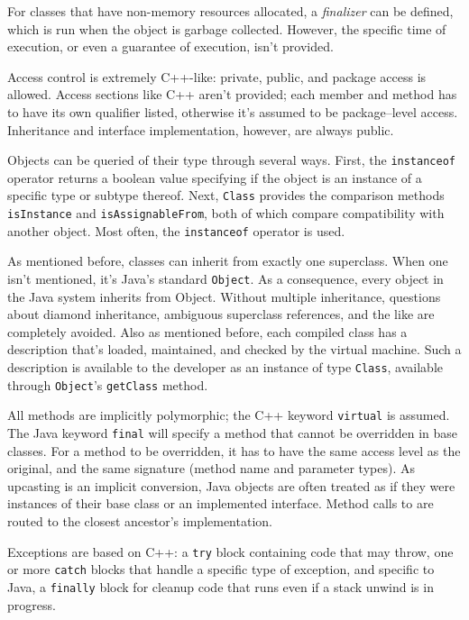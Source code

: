 For classes that have non-memory resources allocated, a \emph{finalizer} can
be defined, which is run when the object is garbage collected. However, the
specific time of execution, or even a guarantee of execution, isn't provided.

Access control is extremely C++-like: private, public, and package access is
allowed. Access sections like C++ aren't provided; each member and method has
to have its own qualifier listed, otherwise it's assumed to be package--level
access. Inheritance and interface implementation, however, are always public.

Objects can be queried of their type through several ways. First, the
\texttt{instanceof} operator returns a boolean value specifying if the object
is an instance of a specific type or subtype thereof. Next, \texttt{Class}
provides the comparison methods \texttt{isInstance} and
\texttt{isAssignableFrom}, both of which compare compatibility with another
object. Most often, the \texttt{instanceof} operator is used.

As mentioned before, classes can inherit from exactly one superclass. When one
isn't mentioned, it's Java's standard \texttt{Object}. As a consequence, every
object in the Java system inherits from Object. Without multiple inheritance,
questions about diamond inheritance, ambiguous superclass references, and the
like are completely avoided. Also as mentioned before, each compiled class has
a description that's loaded, maintained, and checked by the virtual machine.
Such a description is available to the developer as an instance of type
\texttt{Class}, available through \texttt{Object}'s \texttt{getClass} method.

All methods are implicitly polymorphic; the C++ keyword \texttt{virtual} is
assumed. The Java keyword \texttt{final} will specify a method that cannot be
overridden in base classes. For a method to be overridden, it has to have the
same access level as the original, and the same signature (method name and
parameter types). As upcasting is an implicit conversion, Java objects are
often treated as if they were instances of their base class or an implemented
interface. Method calls to are routed to the closest ancestor's
implementation.

Exceptions are based on C++: a \texttt{try} block containing code that may
throw, one or more \texttt{catch} blocks that handle a specific type of
exception, and specific to Java, a \texttt{finally} block for cleanup code
that runs even if a stack unwind is in progress.

